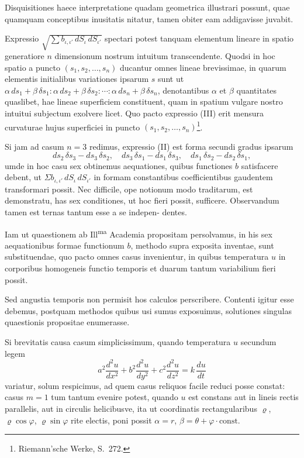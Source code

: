 \documentclass[12pt,a4paper]{article}
\begin{document}
Disquisitiones haece interpretatione quadam geometrica illustrari
 possunt, quae quamquam conceptibus inusitatis nitatur, tamen obiter
 eam addigavisse juvabit.

Expressio $\sqrt{\sum b_{\iota,\iota'}\, dS_{\iota}\, dS_{\iota'}}$ spectari potest tanquam
elementum lineare in spatio generatiore $n$ dimensionum nostrum
 intuitum transcendente. Quodsi in hoc spatio a puncto
 $(s_1, s_2, \ldots, s_n)$ ducantur omnes lineae brevissimae, in quarum
elementis initialibus variationes ipsarum $s$ sunt ut
 $\alpha\, ds_1 + \beta\, \delta s_1 :
 \alpha\, ds_2 + \beta\, \delta s_2 : \cdots :
 \alpha\, ds_n + \beta\, \delta s_n$, denotantibus
$\alpha$ et $\beta$ quantitates quaslibet, hae lineae superficiem constituent,
quam in spatium vulgare nostro intuitui subjectum exolvere licet.
Quo pacto expressio (III) erit mensura curvaturae hujus superficiei
in puncto $(s_1, s_2, \ldots, s_n)$\footnote{Riemann'sche Werke, S.~272.}.

Si jam ad casum $n=3$ redimus, expressio (II) est forma secundi
 gradus ipsarum
\[ds_2\, \delta s_3 - ds_3\, \delta s_2,\quad
  ds_3\, \delta s_1 - ds_1\, \delta s_3,\quad
  ds_1\, \delta s_2 - ds_2\, \delta s_1,\]
umde in hoc casu sex obtinemus aequationes, quibus functiones $b$
satisfacere debent, ut
$\Sigma b_{\iota,\iota'}\, dS_{\iota}\, dS_{\iota'}$ in formam constantibus coefficientibus
gaudentem transformari possit. Nec difficile, ope notionum modo
traditarum, est demonstratu, has sex conditiones, ut hoc fieri possit,
sufficere. Observandum tamen est ternas tantum esse a se indepen-
dentes.

Iam ut quaestionem ab Ill\textsuperscript{ma} Academia propositam persolvamus,
in his sex aequationibus formae functionum $b$, methodo supra exposita
inventae, sunt substituendae, quo pacto omnes casus invenientur, in
quibus temperatura $u$ in corporibus homogeneis functio temporis et
duarum tantum variabilium fieri possit.

Sed angustia temporis non permisit hos calculos perscribere.
Contenti igitur esse debemus, postquam methodos quibus usi sumus
exposuimus, solutiones singulas quaestionis propositae enumerasse.

Si brevitatis causa casum simplicissimum, quando temperatura $u$
secundum legem
\[a^2\frac{d^2 u}{dx^2} + b^2\frac{d^2 u}{dy^2} + c^2\frac{d^2 u}{dz^2} =
 k\, \frac{du}{dt}\]
variatur, solum respicimus, ad quem casus reliquos facile reduci posse
constat: casus $m=1$ tum tantum evenire potest, quando $u$ est
 constans aut in lineis rectis parallelis, aut in circulis helicibusve,
ita ut coordinatis rectangularibus $\varrho$, $\varrho\cos\varphi$, $\varrho\sin\varphi$
rite electis, poni possit
$\alpha = r$, $\beta = \theta + \varphi \cdot \text{const.}$
\end{document}
